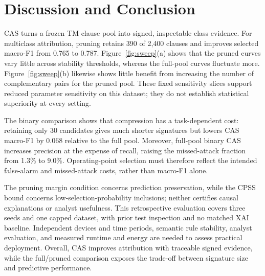 \documentclass[conference]{IEEEtran}
\begin{document}
\section{Discussion and Conclusion}
CAS turns a frozen TM clause pool into signed, inspectable class
evidence. For multiclass attribution, pruning retains 390 of 2,400
clauses and improves selected macro-F1 from 0.765 to 0.787.
Figure~\ref{fig:sweep}(a) shows that the pruned curves vary little
across stability thresholds, whereas the full-pool curves fluctuate
more. Figure~\ref{fig:sweep}(b) likewise shows little benefit from
increasing the number of complementary pairs for the pruned pool.
These fixed sensitivity slices support reduced parameter sensitivity
on this dataset; they do not establish statistical superiority at
every setting.

The binary comparison shows that compression has a task-dependent
cost: retaining only 30 candidates gives much shorter signatures but
lowers CAS macro-F1 by 0.068 relative to the full pool. Moreover,
full-pool binary CAS increases precision at the expense of recall,
raising the missed-attack fraction from 1.3\% to 9.0\%. Operating-point
selection must therefore reflect the intended false-alarm and
missed-attack costs, rather than macro-F1 alone.

The pruning margin condition concerns prediction preservation,
while the CPSS bound concerns low-selection-probability inclusions;
neither certifies causal explanations or analyst usefulness.
This retrospective evaluation covers three seeds and one capped
dataset, with prior test inspection and no matched XAI baseline.
Independent devices and time periods, semantic rule stability,
analyst evaluation, and measured runtime and energy are needed to
assess practical deployment. Overall, CAS improves attribution with
traceable signed evidence, while the full/pruned comparison exposes
the trade-off between signature size and predictive performance.

\clearpage
\end{document}
